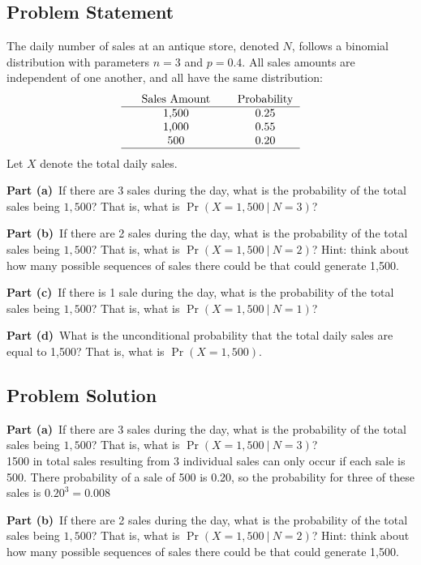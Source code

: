 \documentclass[12pt]{article}
\theoremstyle{definition}
\begin{document}
\subsection*{Problem Statement}

The daily number of sales at an antique store, denoted $N$, follows a binomial distribution with parameters $n = 3$ and $p = 0.4$. All sales amounts are independent of one another, and all have the same distribution:
$$
\begin{tabular}{ccccc}
& Sales Amount & & Probability\\
\hline
& 1,500 & & 0.25\\
& 1,000 & & 0.55\\
& 500 & & 0.20\\
\hline
\end{tabular}
$$
Let $X$ denote the total daily sales.

\bigskip
\noindent
{\bf Part (a)}\ If there are 3 sales during the day, what is the probability of the total sales being $1,500$? That is, what is $\Pr(X = 1,500\ |\ N = 3)$?

\bigskip
\noindent
{\bf Part (b)}\ If there are 2 sales during the day, what is the probability of the total sales being $1,500$? That is, what is $\Pr(X = 1,500\ |\ N = 2)$? Hint: think about how many possible sequences of sales there could be that could generate 1,500.

\bigskip
\noindent
{\bf Part (c)}\ If there is 1 sale during the day, what is the probability of the total sales being $1,500$? That is, what is $\Pr(X = 1,500\ |\ N = 1)$?

\bigskip
\noindent
{\bf Part (d)}\ What is the unconditional probability that the total daily sales are equal to 1,500? That is, what is $\Pr(X = 1,500)$.


\newpage
\subsection*{Problem Solution}

\noindent
{\bf Part (a)}\ If there are 3 sales during the day, what is the probability of the total sales being $1,500$? That is, what is $\Pr(X = 1,500\ |\ N = 3)$?\\

1500 in total sales resulting from 3 individual sales can only occur if each sale is 500. There probability of a sale of 500 is 0.20, so the probability for three of these sales is $0.20^3 = 0.008$


\vspace{3in}
\noindent
{\bf Part (b)}\ If there are 2 sales during the day, what is the probability of the total sales being $1,500$? That is, what is $\Pr(X = 1,500\ |\ N = 2)$? Hint: think about how many possible sequences of sales there could be that could generate 1,500.\\
\end{document}
